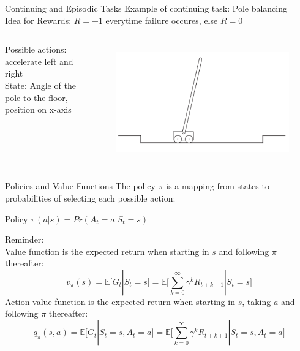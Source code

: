 \documentclass{beamer}
\begin{document}
\begin{frame}{Continuing and Episodic Tasks}
	Example of continuing task: Pole balancing\\
	Idea for Rewards: $R=-1$ everytime failure occures, else $R=0$
	\begin{columns}
	Possible actions: accelerate left and right\\
	State: Angle of the pole to the floor, position on x-axis\\
	\begin{figure}
	\centering
	\includegraphics[width=\linewidth]{Images/pole.png}\\	
	\end{figure}
	\end{columns}
\end{frame}

\begin{frame}{Policies and Value Functions}
	The policy $\pi$ is a mapping from states to probabilities of selecting each possible action:
	\begin{alertblock}{Policy}
	$\pi(a|s) = Pr(A_t = a | S_t = s)$
	\end{alertblock}
	Reminder:\\
	Value function is the expected return when starting in $s$ and following $\pi$ thereafter:  
	 \begin{equation*}
	v_{\pi} (s) = \mathbb{E}\big[ G_t | S_t = s \big] = \mathbb{E}\big[ \sum_{k=0}^{\infty} \gamma^k R_{t+k+1} | S_t = s \big]
	\end{equation*}
	Action value function is the expected return when starting in $s$, taking $a$ and following $\pi$ thereafter:  
	 \begin{equation*}	
	q_{\pi} (s,a) = \mathbb{E}\big[ G_t | S_t = s, A_t = a \big] = \mathbb{E}\big[ \sum_{k=0}^{\infty} \gamma^k R_{t+k+1} | S_t = s, A_t = a  \big] 
	\end{equation*}
\end{frame}
\end{document}
